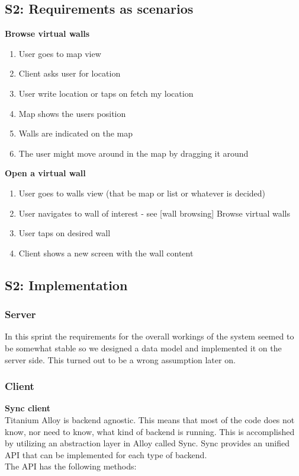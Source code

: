 \documentclass[11pt]{book}
\begin{document}
\subsection{S2: Requirements as scenarios}
\textbf{Browse virtual walls}
\begin{enumerate}
	\item User goes to map view
	\item Client asks user for location
	\item User write location or taps on fetch my location
	\item Map shows the users position
	\item Walls are indicated on the map
	\item The user might move around in the map by dragging it around
\end{enumerate}

\textbf{Open a virtual wall}
\begin{enumerate}
	\item User goes to walls view (that be map or list or whatever is decided)
	\item User navigates to wall of interest - see [wall browsing] Browse virtual walls
	\item User taps on desired wall
	\item Client shows a new screen with the wall content
\end{enumerate}

\subsection{S2: Implementation}

\subsubsection{Server}

In this sprint the requirements for the overall workings of the system seemed to be somewhat stable so we designed a data model and implemented it on the server side. This turned out to be a wrong assumption later on.

\subsubsection{Client}
\textbf{Sync client}\\
Titanium Alloy is backend agnostic. This means that most of the code does not know, nor need to know, what kind of backend is running. This is accomplished by utilizing an abstraction layer in Alloy called Sync. Sync provides an unified API that can be implemented for each type of backend.\\
The API has the following methods:
\end{document}
